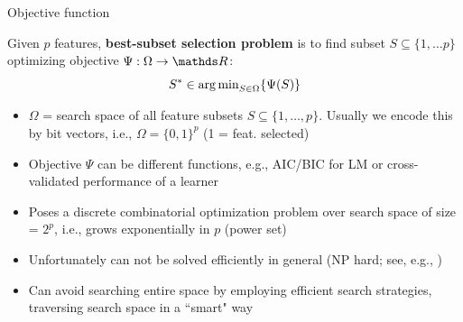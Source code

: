 \documentclass[11pt,compress,t,notes=noshow, xcolor=table]{beamer}
\begin{document}





  \begin{vbframe}{Objective function}


    Given $p$ features, \textbf{best-subset selection problem} is to find subset $S \subseteq \{ 1, \dots p \}$ optimizing objective $\Psi: \Omega \rightarrow \R$:
    \vspace{-0.15cm}
    $$S^{*}  \in \operatorname{arg\,min}_{{S \in \Omega}} \{ \Psi(S) \}$$
    \vspace{-0.8cm}
    \begin{itemize}
    \setlength{\itemsep}{0.8em}
     \item $\Omega$  = search space of all feature subsets $S\subseteq\{ 1, \dots, p \}$. Usually we encode this by
      bit vectors, i.e., $\Omega = \{0, 1\}^p$ (1 = feat. selected)
     \item Objective $\Psi$ can be different functions, e.g., AIC/BIC for LM or cross-validated performance of a learner
     \item Poses a discrete combinatorial optimization problem over search space of size = $2^p$, i.e., grows exponentially in $p$ (power set)%
     \item Unfortunately can not be solved efficiently in general (NP hard; see, e.g., )
     \item Can avoid searching entire space by employing efficient search strategies, traversing search space in a ``smart" way %

    \end{itemize}

  \end{vbframe}
\end{document}
